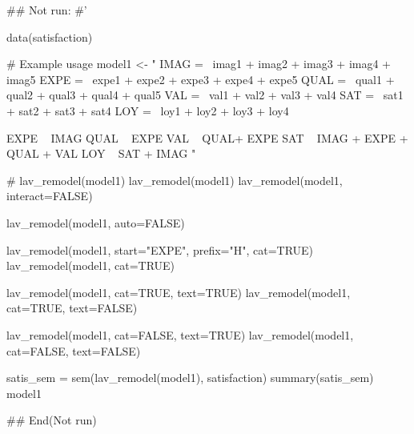 \documentclass[a4paper]{book}
\begin{document}
\begin{Examples}
\begin{ExampleCode}

\#\# Not run: 
#'


data(satisfaction)

# Example usage
model1 <- "
IMAG =~ imag1 + imag2 + imag3 + imag4 + imag5
EXPE =~ expe1 + expe2 + expe3 + expe4 + expe5
QUAL =~ qual1 + qual2 + qual3 + qual4 + qual5
VAL =~ val1 + val2 + val3 + val4
SAT =~ sat1 + sat2 + sat3 + sat4
LOY =~ loy1 + loy2 + loy3 + loy4

EXPE ~ IMAG
QUAL ~ EXPE
VAL ~  QUAL+ EXPE
SAT ~ IMAG + EXPE + QUAL + VAL
LOY ~ SAT + IMAG
"



# lav_remodel(model1)
lav_remodel(model1)%
lav_remodel(model1, interact=FALSE)%

lav_remodel(model1, auto=FALSE)%

lav_remodel(model1, start="EXPE", prefix="H", cat=TRUE)
lav_remodel(model1, cat=TRUE)

lav_remodel(model1, cat=TRUE, text=TRUE)
lav_remodel(model1, cat=TRUE, text=FALSE)

lav_remodel(model1, cat=FALSE, text=TRUE)
lav_remodel(model1, cat=FALSE, text=FALSE)


satis_sem = sem(lav_remodel(model1), satisfaction)
summary(satis_sem)
model1 %



## End(Not run)


\end{ExampleCode}
\end{Examples}
\end{document}
